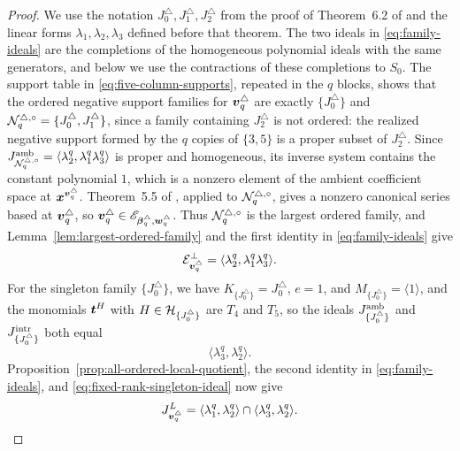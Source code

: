 \begin{proof}
	We use the notation \(J_0^\triangle,J_1^\triangle,J_2^\triangle\) from the proof of Theorem~6.2 of \cite{Nak26} and the linear forms \(\lambda_1,\lambda_2,\lambda_3\) defined before that theorem.
	The two ideals in \eqref{eq:family-ideals} are the completions of the homogeneous polynomial ideals with the same generators, and below we use the contractions of these completions to \(S_0\).
	The support table in \eqref{eq:five-column-supports}, repeated in the \(q\) blocks, shows that the ordered negative support families for \(\boldsymbol{v}_q^\triangle\) are exactly \(\{J_0^\triangle\}\) and \(\mathcal N_q^{\triangle,\circ}=\{J_0^\triangle,J_1^\triangle\}\), since a family containing \(J_2^\triangle\) is not ordered: the realized negative support formed by the \(q\) copies of \(\{3,5\}\) is a proper subset of \(J_2^\triangle\).
	Since \(J_{\mathcal N_q^{\triangle,\circ}}^{\mathrm{amb}}=\langle\lambda_2^q,\lambda_1^q\lambda_3^q\rangle\) is proper and homogeneous, its inverse system contains the constant polynomial \(1\), which is a nonzero element of the ambient coefficient space at \(\boldsymbol{x}^{\boldsymbol{v}_q^\triangle}\).
	Theorem~5.5 of \cite{OS25}, applied to \(\mathcal N_q^{\triangle,\circ}\), gives a nonzero canonical series based at \(\boldsymbol{v}_q^\triangle\), so \(\boldsymbol{v}_q^\triangle\in\mathscr E_{\boldsymbol{\beta}_q^\triangle,\boldsymbol{w}_q^\triangle}\).
	Thus \(\mathcal N_q^{\triangle,\circ}\) is the largest ordered family, and Lemma~\ref{lem:largest-ordered-family} and the first identity in \eqref{eq:family-ideals} give
	\begin{equation}
		\mathcal E_{\boldsymbol{v}_q^\triangle}^{\perp}
		=
		\langle\lambda_2^q,\lambda_1^q\lambda_3^q\rangle.
		\label{eq:fixed-rank-full-local-ideal}
	\end{equation}
	For the singleton family \(\{J_0^\triangle\}\), we have \(K_{\{J_0^\triangle\}}=J_0^\triangle\), \(e=1\), and \(M_{\{J_0^\triangle\}}=\langle1\rangle\), and the monomials \(\boldsymbol{t}^{H}\) with \(H\in\mathcal H_{\{J_0^\triangle\}}\) are \(T_4\) and \(T_5\), so the ideals \(J_{\{J_0^\triangle\}}^{\mathrm{amb}}\) and \(J_{\{J_0^\triangle\}}^{\mathrm{intr}}\) both equal
	\begin{equation}
		\langle\lambda_3^q,\lambda_2^q\rangle.
		\label{eq:fixed-rank-singleton-ideal}
	\end{equation}
	Proposition~\ref{prop:all-ordered-local-quotient}, the second identity in \eqref{eq:family-ideals}, and \eqref{eq:fixed-rank-singleton-ideal} now give
	\begin{equation}
		J_{\boldsymbol{v}_q^\triangle}^{L}
		=
		\langle\lambda_1^q,\lambda_2^q\rangle
		\cap
		\langle\lambda_3^q,\lambda_2^q\rangle.
		\label{eq:fixed-rank-all-family-intrinsic-ideal}
	\end{equation}


\end{proof}

